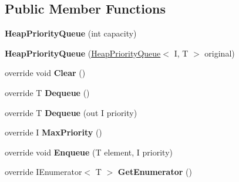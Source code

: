 \subsection*{Public Member Functions}
\begin{DoxyCompactItemize}
\item 
\mbox{\label{class_data_structures_1_1_heap_priority_queue_a534860c61751a4b72ec6960259f0202e}} 
{\bfseries Heap\+Priority\+Queue} (int capacity)
\item 
\mbox{\label{class_data_structures_1_1_heap_priority_queue_ad591fc63bc6be7028267e66d90f55d22}} 
{\bfseries Heap\+Priority\+Queue} (\hyperlink{class_data_structures_1_1_heap_priority_queue}{Heap\+Priority\+Queue}$<$ I, T $>$ original)
\item 
\mbox{\label{class_data_structures_1_1_heap_priority_queue_a00b61bd157c306de51be32441419521b}} 
override void {\bfseries Clear} ()
\item 
\mbox{\label{class_data_structures_1_1_heap_priority_queue_a09e40d86cc08d7476bb3319e6b37515b}} 
override T {\bfseries Dequeue} ()
\item 
\mbox{\label{class_data_structures_1_1_heap_priority_queue_abc2b3a152c93202b4e3a7cf9292ce9d1}} 
override T {\bfseries Dequeue} (out I priority)
\item 
\mbox{\label{class_data_structures_1_1_heap_priority_queue_abb33bb5d4372b108889f6bf26084860c}} 
override I {\bfseries Max\+Priority} ()
\item 
\mbox{\label{class_data_structures_1_1_heap_priority_queue_ae76c92ec00718a34dc2c97fc79088d5f}} 
override void {\bfseries Enqueue} (T element, I priority)
\item 
\mbox{\label{class_data_structures_1_1_heap_priority_queue_a1a494343382d19d56e05302ce33c9104}} 
override I\+Enumerator$<$ T $>$ {\bfseries Get\+Enumerator} ()

\end{DoxyCompactItemize}
